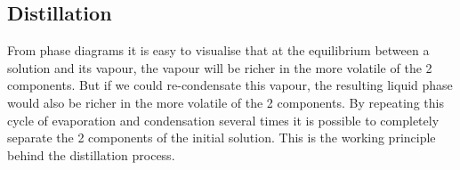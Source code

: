 \documentclass[12pt,a4paper]{report}
\begin{document}
   \subsection*{Distillation}
   From phase diagrams it is easy to visualise that at the equilibrium between a solution and its vapour, the vapour will be richer in the more volatile of the 2 components. But if we could re-condensate this vapour, the resulting liquid phase  would also be richer in the more volatile of the 2 components. By repeating this cycle of evaporation and condensation several times it is possible to completely separate the 2 components of the initial solution. This is the working principle behind the distillation process.
   \begin{figure}[H]
   \begin{center}
\end{center}
\end{figure}
\end{document}
